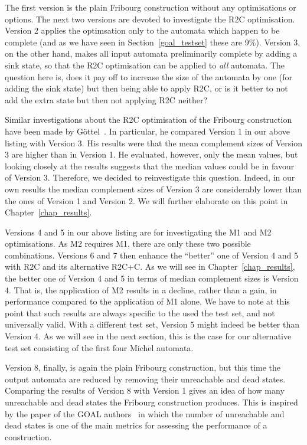 The first version is the plain Fribourg construction without any optimisations or options. The next two versions are devoted to investigate the R2C optimisation. Version 2 applies the optimsation only to the automata which happen to be complete (and as we have seen in Section~\ref{goal_testset} these are 9\%). Version 3, on the other hand, makes all input automata preliminarily complete by adding a sink state, so that the R2C optimisation can be applied to \textit{all} automata. The question here is, does it pay off to increase the size of the automata by one (for adding the sink state) but then being able to apply R2C, or is it better to not add the extra state but then not applying R2C neither?

Similar investigations about the R2C optimisation of the Fribourg construction have been made by Göttel~\cite{2013_bsc_goettel}. In particular, he compared Version 1 in our above listing with Version 3. His results were that the mean complement sizes of Version 3 are higher than in Version 1. He evaluated, however, only the mean values, but looking closely at the results suggests that the median values could be in favour of Version 3. Therefore, we decided to reinvestigate this question. Indeed, in our own results the median complement sizes of Version 3 are considerably lower than the ones of Version 1 and Version 2. We will further elaborate on this point in Chapter~\ref{chap_results}.

Versions 4 and 5 in our above listing are for investigating the M1 and M2 optimisations. As M2 requires M1, there are only these two possible combinations. Versions 6 and 7 then enhance the ``better'' one of Version 4 and 5 with R2C and its alternative R2C+C. As we will see in Chapter~\ref{chap_results}, the better one of Version 4 and 5 in terms of median complement sizes is Version 4. That is, the application of M2 results in a decline, rather than a gain, in performance compared to the application of M1 alone. We have to note at this point that such results are always specific to the used the test set, and not universally valid. With a different test set, Version 5 might indeed be better than Version 4. As we will see in the next section, this is the case for our alternative test set consisting of the first four Michel automata.

Version 8, finally, is again the plain Fribourg construction, but this time the output automata are reduced by removing their unreachable and dead states. Comparing the results of Version 8 with Version 1 gives an idea of how many unreachable and dead states the Fribourg construction produces. This is inspired by the paper of the GOAL authors~\cite{2011_tsai} in which the number of unreachable and dead states is one of the main metrics for assessing the performance of a construction.

